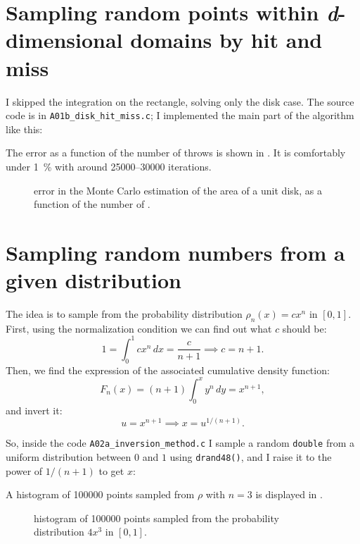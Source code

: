 \section{Sampling random points within \emph{d}-dimensional domains by hit and
miss}
I skipped the integration on the rectangle, solving only the disk case.  The
source code is in \texttt{A01b\_disk\_hit\_miss.c}; I implemented the main part
of the algorithm like this:

The error as a function of the number of throws is shown in .
It is comfortably under \qty{1}{\percent} with around \numrange{25000}{30000}
iterations.

\begin{figure}
    \centering
    
    \caption{error in the Monte Carlo estimation of the area of a unit
        disk, as a function of the number of .}
    \label{fig:A01b}
\end{figure}

\section{Sampling random numbers from a given distribution}
The idea is to sample from the probability distribution $\rho_n(x) = c x^n$ in
$[0, 1]$.  First, using the normalization condition we can find out what $c$
should be:
\begin{equation}
    1 = \int_{0}^{1} cx^n \, dx = \frac{c}{n + 1} \implies c = n + 1.
\end{equation}
Then, we find the expression of the associated cumulative density function:
\begin{equation}
    F_n(x) = (n + 1) \int_{0}^{x} y^n \, dy = x^{n + 1},
\end{equation}
and invert it:
\begin{equation}
    u = x^{n + 1} \implies x = u^{1 / (n + 1)}.
\end{equation}

So, inside the code \texttt{A02a\_inversion\_method.c} I sample a random
\texttt{double} from a uniform distribution between $0$ and $1$ using
\texttt{drand48()}, and I raise it to the power of $1 / (n + 1)$ to get $x$:

A histogram of \num{100000} points sampled from $\rho$ with $n = 3$ is displayed
in .

\begin{figure}
    \centering
    
    \caption{histogram of \num{100000} points sampled from the probability
        distribution $4 x^3$ in $[0, 1]$.}
    \label{fig:A02a_3}
\end{figure}

